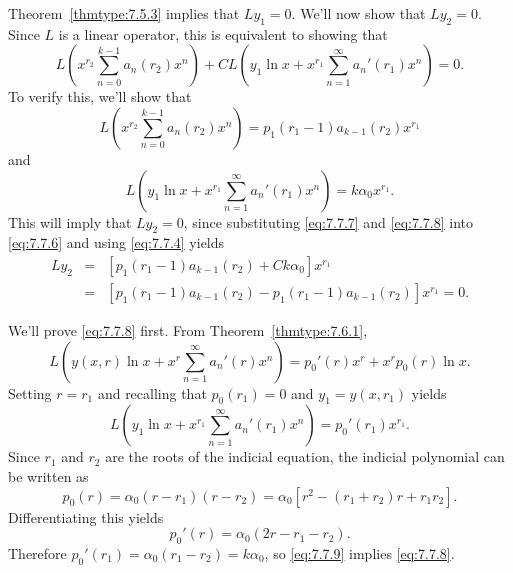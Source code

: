 \proof Theorem~\ref{thmtype:7.5.3} implies that $Ly_{1}=0$. We'll now show that $Ly_{2}=0$. Since
$L$ is a linear operator, this is equivalent to showing that
\begin{equation}
  \label{eq:7.7.6}L\left( x^{r_{2}}\sum_{n=0}^{k-1}a_{n}(r_{2})x^{n}\right)+CL\left(y_{1}\ln x+x^{r_{1}}\sum_{n=1}^{\infty}a_{n}'(r_{1})x^{n}\right)=0.
\end{equation}
To verify this, we'll show that
\begin{equation}
  \label{eq:7.7.7}L\left(x^{r_{2}}\sum_{n=0}^{k-1}a_{n}(r_{2})x^{n}\right)=p_{1}(r_{1}-1)a_{k-1}(r_{2})x^{r_{1}}
\end{equation}
and
\begin{equation}
  \label{eq:7.7.8}L\left(y_{1}\ln x+x^{r_{1}}\sum_{n=1}^{\infty}a_{n}'(r_{1})x^{n}\right)=k\alpha_{0}x^{r_{1}}.
\end{equation}
This will imply that $Ly_{2}=0$, since substituting \eqref{eq:7.7.7} and \eqref{eq:7.7.8} into
\eqref{eq:7.7.6} and using \eqref{eq:7.7.4} yields
\begin{eqnarray*}
  Ly_{2} & = & \left[p_{1}(r_{1}-1)a_{k-1}(r_{2})+Ck\alpha_{0}\right]x^{r_{1}} \\
         & = & \left[p_{1}(r_{1}-1)a_{k-1}(r_{2})-p_{1}(r_{1}-1)a_{k-1}(r_{2})\right]x^{r_{1}}=0.
\end{eqnarray*}

We'll prove \eqref{eq:7.7.8} first. From Theorem~\ref{thmtype:7.6.1},
\[
  L\left(y(x,r)\ln x+x^{r}\sum_{n=1}^{\infty}a_{n}'(r)x^{n}\right)=p_{0}'(r)x^{r}+x^{r}p_{0}(r)\ln x.
\]
Setting $r=r_{1}$ and recalling that $p_{0}(r_{1})=0$ and $y_{1}=y(x,r_{1})$ yields
\begin{equation}
  \label{eq:7.7.9}L\left(y_{1}\ln x+x^{r_{1}}\sum_{n=1}^{\infty}a_{n}'(r_{1})x^{n}\right)=p_{0}'(r_{1})x^{r_{1}}.
\end{equation}
Since $r_{1}$ and $r_{2}$ are the roots of the indicial equation, the indicial polynomial can be
written as
\[
  p_{0}(r)=\alpha_{0}(r-r_{1})(r-r_{2})=\alpha_{0}\left[r^{2}-(r_{1}+r_{2})r+r_{1}r_{2}\right].
\]
Differentiating this yields
\[
  p_{0}'(r)=\alpha_{0}(2r-r_{1}-r_{2}).
\]
Therefore $p_{0}'(r_{1})=\alpha_{0}(r_{1}-r_{2})=k\alpha_{0}$, so \eqref{eq:7.7.9} implies
\eqref{eq:7.7.8}.

